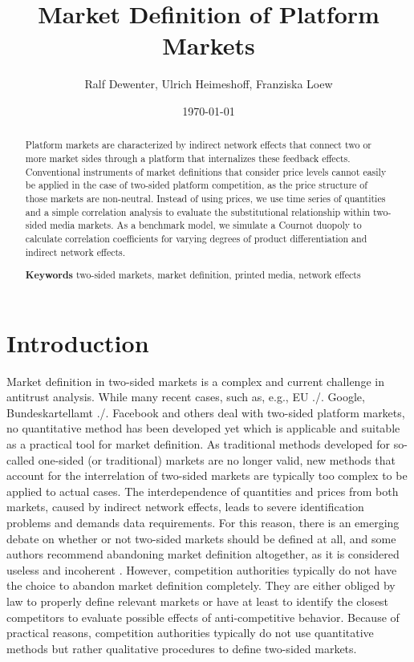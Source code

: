 \documentclass[12pt,a4paper,notitlepage]{article}
\title{Market Definition of Platform Markets}
\date{\today}
\author{Ralf Dewenter, Ulrich Heimeshoff, Franziska Loew}
\begin{document}
\begin{titlepage}
	\maketitle
	\begin{abstract}
		Platform markets are characterized by indirect network effects that connect two or more market sides through a platform that internalizes these feedback effects. Conventional instruments of market definitions that consider price levels cannot easily be applied in the case of two-sided platform competition, as the price structure of those markets are non-neutral. Instead of using prices, we use time series of quantities and a simple correlation analysis to evaluate the substitutional relationship within two-sided media markets. As a benchmark model, we simulate a Cournot duopoly to calculate correlation coefficients for varying degrees of product differentiation and indirect network effects.
		
		\textbf{Keywords} two-sided markets, market definition, printed media, network effects

	\end{abstract}

\end{titlepage}
\setcounter{page}{2}

\section{Introduction}

Market definition in two-sided markets is a complex and current challenge in antitrust analysis. While many recent cases, such as, e.g., EU ./. Google, Bundeskartellamt ./. Facebook and others deal with two-sided platform markets, no quantitative method has been developed yet which is applicable and suitable as a practical tool for market definition. As traditional methods developed for so-called one-sided (or traditional) markets are no longer valid, new methods that account for the interrelation of two-sided markets are typically too complex to be applied to actual cases. The interdependence of quantities and prices from both markets, caused by indirect network effects, leads to severe identification problems and demands data requirements. For this reason, there is an emerging debate on whether or not two-sided markets should be defined at all, and some authors recommend abandoning market definition altogether, as it is considered useless and incoherent \citep{noel_analyzing_2005, kaplow_market_2014}. However, competition authorities typically do not have the choice to abandon market definition completely. They are either obliged by law to properly define relevant markets or have at least to identify the closest competitors to evaluate possible effects of anti-competitive behavior. Because of practical reasons, competition authorities typically do not use quantitative methods but rather qualitative procedures to define two-sided markets.   
\end{document}
